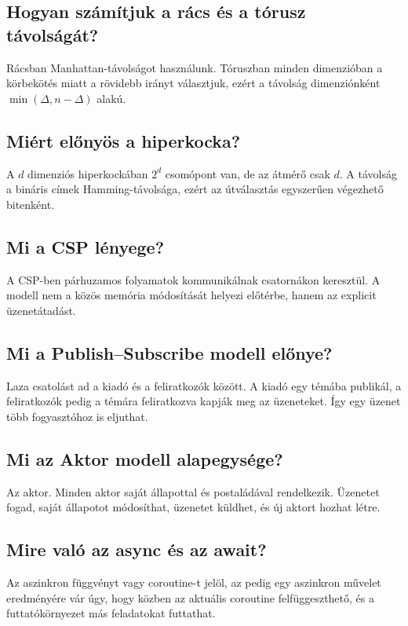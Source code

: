 \subsection{Hogyan számítjuk a rács és a tórusz távolságát?}

Rácsban Manhattan-távolságot használunk. Tóruszban minden dimenzióban a körbekötés miatt a rövidebb irányt választjuk, ezért a távolság dimenziónként $\min(\Delta,n-\Delta)$ alakú.

\subsection{Miért előnyös a hiperkocka?}

A $d$ dimenziós hiperkockában $2^d$ csomópont van, de az átmérő csak $d$. A távolság a bináris címek Hamming-távolsága, ezért az útválasztás egyszerűen végezhető bitenként.

\subsection{Mi a CSP lényege?}

A CSP-ben párhuzamos folyamatok kommunikálnak csatornákon keresztül. A modell nem a közös memória módosítását helyezi előtérbe, hanem az explicit üzenetátadást.

\subsection{Mi a Publish--Subscribe modell előnye?}

Laza csatolást ad a kiadó és a feliratkozók között. A kiadó egy témába publikál, a feliratkozók pedig a témára feliratkozva kapják meg az üzeneteket. Így egy üzenet több fogyasztóhoz is eljuthat.

\subsection{Mi az Aktor modell alapegysége?}

Az aktor. Minden aktor saját állapottal és postaládával rendelkezik. Üzenetet fogad, saját állapotot módosíthat, üzenetet küldhet, és új aktort hozhat létre.

\subsection{Mire való az async és az await?}

Az  aszinkron függvényt vagy coroutine-t jelöl, az  pedig egy aszinkron művelet eredményére vár úgy, hogy közben az aktuális coroutine felfüggeszthető, és a futtatókörnyezet más feladatokat futtathat.

